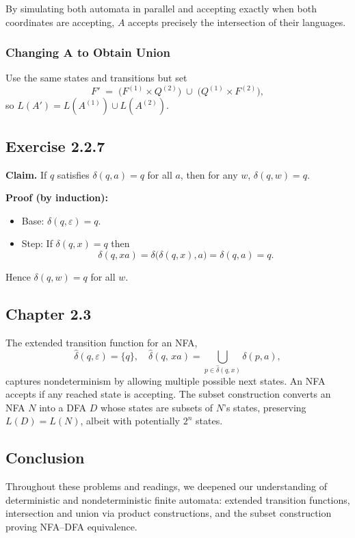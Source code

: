 \documentclass{article}
\begin{document}
By simulating both automata in parallel and accepting exactly when both coordinates are accepting, \(A\) accepts precisely the intersection of their languages.

\subsubsection*{Changing \(\mathbf{A}\) to Obtain Union}

Use the same states and transitions but set
\[
  F' \;=\; \bigl(F^{(1)}\times Q^{(2)}\bigr)\;\cup\;\bigl(Q^{(1)}\times F^{(2)}\bigr),
\]
so \(L(A')=L(A^{(1)})\cup L(A^{(2)})\).

\subsection{Exercise 2.2.7}

\textbf{Claim.} If \(q\) satisfies \(\delta(q,a)=q\) for all \(a\), then for any \(w\), \(\delta(q,w)=q\).

\textbf{Proof (by induction):}
\begin{itemize}
\item Base: \(\delta(q,\varepsilon)=q\).
\item Step: If \(\delta(q,x)=q\) then
\[
  \delta(q,xa) = \delta\bigl(\delta(q,x),a\bigr) = \delta(q,a) = q.
\]
\end{itemize}
Hence \(\delta(q,w)=q\) for all \(w\).

\subsection{Chapter 2.3}

The extended transition function for an NFA,
\[
  \hat{\delta}(q,\varepsilon)=\{q\},\quad
  \hat{\delta}(q,\,xa)=\bigcup_{p\in\hat{\delta}(q,x)}\delta(p,a),
\]
captures nondeterminism by allowing multiple possible next states.  An NFA accepts if any reached state is accepting.  The subset construction converts an NFA \(N\) into a DFA \(D\) whose states are subsets of \(N\)’s states, preserving \(L(D)=L(N)\), albeit with potentially \(2^n\) states.

\subsection{Conclusion}

Throughout these problems and readings, we deepened our understanding of deterministic and nondeterministic finite automata: extended transition functions, intersection and union via product constructions, and the subset construction proving NFA–DFA equivalence.
\end{document}
